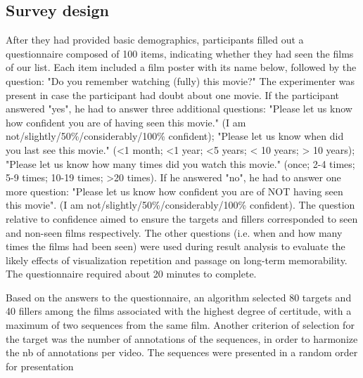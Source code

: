 \documentclass[sigconf]{acmart}
\begin{document}





\subsection{Survey design}
After they had provided basic demographics, participants filled out a questionnaire composed of 100 items, indicating whether they had seen the films of our list.
Each item included a film poster with its name below, followed by the question: "Do you remember watching (fully) this movie?" The experimenter was present in case the participant had doubt about one movie.
If the participant answered "yes", he had to answer three additional questions: "Please let us know how confident you are of having seen this movie." (I am not/slightly/50\%/considerably/100\% confident); "Please let us know when did you last see this movie." (<1 month; <1 year; <5 years; < 10 years; > 10 years); "Please let us know how many times did you watch this movie." (once; 2-4 times; 5-9 times; 10-19 times; >20 times).
If he answered "no", he had to answer one more question: "Please let us know how confident you are of NOT having seen this movie". (I am not/slightly/50\%/considerably/100\% confident).
The question relative to confidence aimed to ensure the targets and fillers corresponded to seen and non-seen films respectively.
The other questions (i.e. when and how many times the films had been seen) were used during result analysis to evaluate the likely effects of visualization repetition and passage on long-term memorability.
The questionnaire required about 20 minutes to complete.

Based on the answers to the questionnaire, an algorithm selected 80 targets and 40 fillers among the films associated with the highest degree of certitude, with a maximum of two sequences from the same film.
Another criterion of selection for the target was the number of annotations of the sequences, in order to harmonize the nb of annotations per video.
The sequences were presented in a random order for presentation
\end{document}
